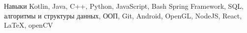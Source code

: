 \begin{rubric}{Навыки}
	Kotlin, Java, C++, Python, JavaScript, Bash
    Spring Framework, SQL, алгоритмы и структуры данных, ООП, Git, Android, OpenGL, NodeJS, React, \LaTeX, openCV
\end{rubric}